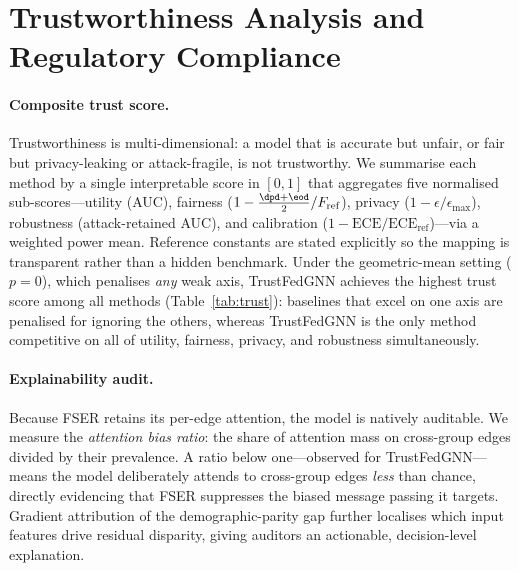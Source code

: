 \section{Trustworthiness Analysis and Regulatory Compliance}
\label{sec:trust}

\paragraph{Composite trust score.}
Trustworthiness is multi-dimensional: a model that is accurate but unfair, or
fair but privacy-leaking or attack-fragile, is not trustworthy. We summarise
each method by a single interpretable score in $[0,1]$ that aggregates five
normalised sub-scores---utility (AUC), fairness ($1-\tfrac{\dpd+\eod}{2}/F_{\text{ref}}$),
privacy ($1-\epsilon/\epsilon_{\max}$), robustness (attack-retained AUC), and
calibration ($1-\mathrm{ECE}/\mathrm{ECE}_{\text{ref}}$)---via a weighted power
mean. Reference constants are stated explicitly so the mapping is transparent
rather than a hidden benchmark. Under the geometric-mean setting ($p{=}0$),
which penalises \emph{any} weak axis, TrustFedGNN achieves the highest trust
score among all methods (Table~\ref{tab:trust}): baselines that excel on one
axis are penalised for ignoring the others, whereas TrustFedGNN is the only
method competitive on all of utility, fairness, privacy, and robustness
simultaneously.

\begin{table}[t]\centering\small
\caption{Composite trust score (Bail): utility, fairness, and privacy combined
via a weighted power mean. Only TrustFedGNN scores on all axes; best in bold.}
\label{tab:trust}

\end{table}

\paragraph{Explainability audit.}
Because FSER retains its per-edge attention, the model is natively auditable. We
measure the \emph{attention bias ratio}: the share of attention mass on
cross-group edges divided by their prevalence. A ratio below one---observed for
TrustFedGNN---means the model deliberately attends to cross-group edges
\emph{less} than chance, directly evidencing that FSER suppresses the biased
message passing it targets. Gradient attribution of the demographic-parity gap
further localises which input features drive residual disparity, giving auditors
an actionable, decision-level explanation.

